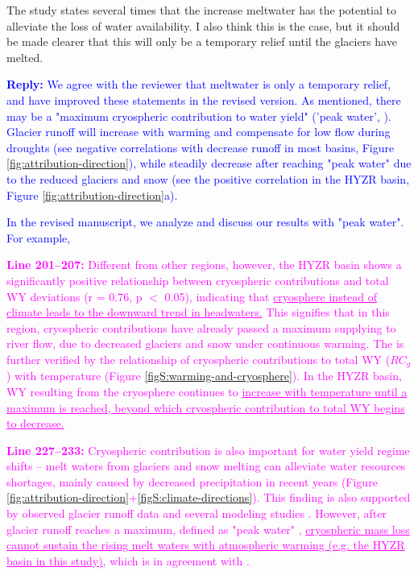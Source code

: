 \documentclass[11pt]{article}
\newcounter{reviewer}
\newcounter{point}[reviewer]
\renewcommand{\thepoint}{Comment\,\thereviewer.\arabic{point}:}
\newcommand{\point}[1]{\refstepcounter{point} \bigskip \noindent {\fontseries{b}\selectfont \thepoint} #1 \par}
\newcommand{\reply}[1]{\bigskip \textcolor{blue}{\noindent \textbf {Reply:} #1}}
\newcommand{\nextreply}[1]{\bigskip \textcolor{blue}{\noindent #1}}
\newcommand{\revised}[3][2]{\bigskip \textcolor{magenta}{\noindent \textbf{Line #2:} #3}}
\begin{document}
\point{The study states several times that the increase meltwater has the potential to alleviate the loss of water availability. I also think this is the case, but it should be made clearer that this will only be a temporary relief until the glaciers have melted.}
\reply{We agree with the reviewer that meltwater is only a temporary relief, and have improved these statements in the revised version. As mentioned, there may be a "maximum cryospheric contribution to water yield" ('peak water', \citealt{gleick2010peak}). Glacier runoff will increase with warming and compensate for low flow during droughts (see negative correlations with decrease runoff in most basins, Figure \ref{fig:attribution-direction}), while steadily decrease after reaching "peak water" due to the reduced glaciers and snow (see the positive correlation in the HYZR basin, Figure \ref{fig:attribution-direction}a).}

\nextreply{In the revised manuscript, we analyze and discuss our results with "peak water". For example,}

\revised{201--207}{Different from other regions, however, the HYZR basin shows a significantly positive relationship between cryospheric contributions and total WY deviations (r = 0.76, p $<$ 0.05), indicating that \ul{cryosphere instead of climate leads to the downward trend in headwaters.}
This signifies that in this region, cryospheric contributions have already passed a maximum supplying to river flow, due to decreased glaciers and snow under continuous warming. 
The is further verified by the relationship of cryospheric contributions to total WY ($RC_g$) with temperature (Figure \ref{figS:warming-and-cryosphere}). 
In the HYZR basin, WY resulting from the cryosphere continues to \ul{increase with temperature until a maximum is reached, beyond which cryospheric contribution to total WY begins to decrease.}}

\revised{227--233}{Cryospheric contribution is also important for water yield regime shifts -- melt waters from glaciers and snow melting can alleviate water resources shortages, mainly caused by decreased precipitation in recent years (Figure \ref{fig:attribution-direction}+\ref{figS:climate-directions}). This finding is also supported by observed glacier runoff data \citep{yao2010glacial} and several modeling studies \citep{lutz2014consistent, Zhang2020VariationOM, wang2021tp}. However, after glacier runoff reaches a maximum, defined as "peak water" \citep{gleick2010peak}, \ul{cryospheric mass loss cannot sustain the rising melt waters with atmospheric warming (e.g. the HYZR basin in this study)}, which is in agreement with \citet{huss2018global}.}
\end{document}
